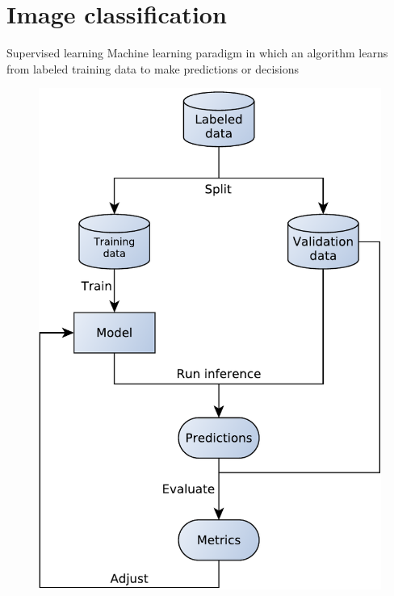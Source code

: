 
\section{Image classification}

\begin{frame}{Supervised learning}
Machine learning paradigm in which an algorithm learns from labeled training
data to make predictions or decisions
  \begin{figure}
	\includegraphics[width=\linewidth,height=0.75\textheight,keepaspectratio]{images/supervised_learning.pdf}
  \end{figure}
\end{frame}

